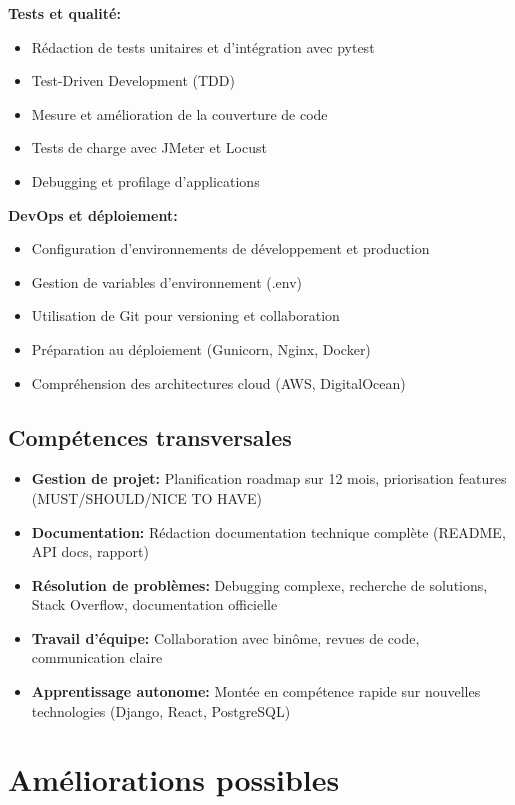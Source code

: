 \textbf{Tests et qualité:}
\begin{itemize}
    \item Rédaction de tests unitaires et d'intégration avec pytest
    \item Test-Driven Development (TDD)
    \item Mesure et amélioration de la couverture de code
    \item Tests de charge avec JMeter et Locust
    \item Debugging et profilage d'applications
\end{itemize}

\textbf{DevOps et déploiement:}
\begin{itemize}
    \item Configuration d'environnements de développement et production
    \item Gestion de variables d'environnement (.env)
    \item Utilisation de Git pour versioning et collaboration
    \item Préparation au déploiement (Gunicorn, Nginx, Docker)
    \item Compréhension des architectures cloud (AWS, DigitalOcean)
\end{itemize}

\subsection{Compétences transversales}

\begin{itemize}
    \item \textbf{Gestion de projet:} Planification roadmap sur 12 mois, priorisation features (MUST/SHOULD/NICE TO HAVE)
    \item \textbf{Documentation:} Rédaction documentation technique complète (README, API docs, rapport)
    \item \textbf{Résolution de problèmes:} Debugging complexe, recherche de solutions, Stack Overflow, documentation officielle
    \item \textbf{Travail d'équipe:} Collaboration avec binôme, revues de code, communication claire
    \item \textbf{Apprentissage autonome:} Montée en compétence rapide sur nouvelles technologies (Django, React, PostgreSQL)
\end{itemize}

\section{Améliorations possibles}

